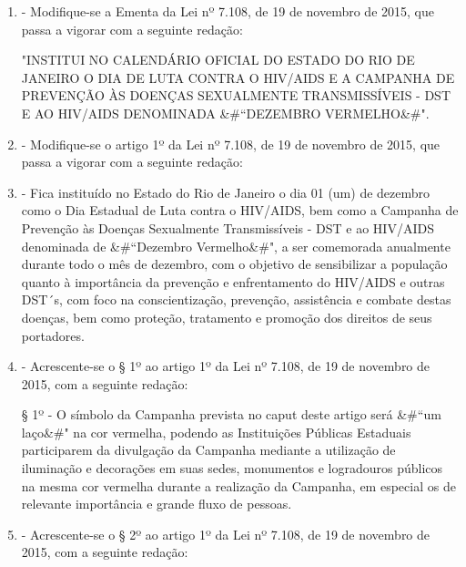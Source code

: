 \documentclass[10pt]{article}
\begin{document}
\begin{enumerate}[label=Art. \arabic*\textdegree]
\item - Modifique-se a Ementa da Lei nº 7.108, de 19 de novembro de 2015, que passa a vigorar com a seguinte redação:



"INSTITUI NO CALENDÁRIO OFICIAL DO ESTADO DO RIO DE JANEIRO O DIA DE LUTA CONTRA O HIV/AIDS E A CAMPANHA DE PREVENÇÃO ÀS DOENÇAS SEXUALMENTE TRANSMISSÍVEIS  - DST E AO HIV/AIDS DENOMINADA &#``DEZEMBRO VERMELHO&#".



\item - Modifique-se o artigo 1º da Lei nº 7.108, de 19 de novembro de 2015, que passa a vigorar com a seguinte redação:



\item - Fica instituído no Estado do Rio de Janeiro o dia 01 (um) de dezembro como o Dia Estadual de Luta contra o HIV/AIDS, bem como a Campanha de Prevenção às Doenças Sexualmente Transmissíveis - DST e ao HIV/AIDS denominada de &#``Dezembro Vermelho&#", a ser comemorada anualmente durante todo o mês de dezembro, com o objetivo de sensibilizar a população quanto à importância da prevenção e enfrentamento do HIV/AIDS e outras DST´s, com foco na conscientização, prevenção, assistência e combate destas doenças, bem como proteção, tratamento  e promoção dos direitos de seus portadores.



\item - Acrescente-se o § 1º ao artigo 1º da Lei nº 7.108, de 19 de novembro de 2015, com a seguinte redação:



§ 1º - O símbolo da Campanha prevista no caput deste artigo será &#``um laço&#"  na cor vermelha, podendo as Instituições Públicas Estaduais participarem da divulgação da Campanha mediante a utilização de iluminação e decorações em suas sedes, monumentos e logradouros públicos na mesma cor vermelha durante a realização da Campanha, em especial os de relevante importância e grande fluxo de pessoas.







\item - Acrescente-se o § 2º ao artigo 1º da Lei nº 7.108, de 19 de novembro de 2015, com a seguinte redação:




\end{enumerate}
\end{document}
